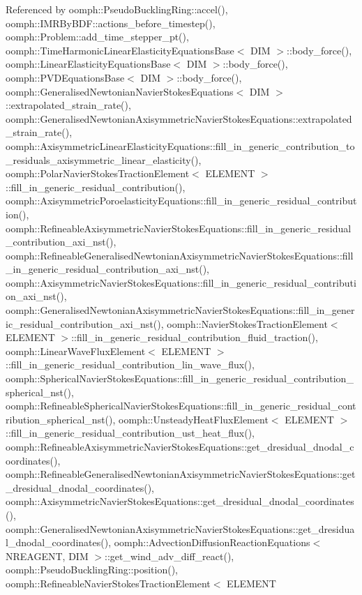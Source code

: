 Referenced by oomph\+::\+Pseudo\+Buckling\+Ring\+::accel(), oomph\+::\+I\+M\+R\+By\+B\+D\+F\+::actions\+\_\+before\+\_\+timestep(), oomph\+::\+Problem\+::add\+\_\+time\+\_\+stepper\+\_\+pt(), oomph\+::\+Time\+Harmonic\+Linear\+Elasticity\+Equations\+Base$<$ D\+I\+M $>$\+::body\+\_\+force(), oomph\+::\+Linear\+Elasticity\+Equations\+Base$<$ D\+I\+M $>$\+::body\+\_\+force(), oomph\+::\+P\+V\+D\+Equations\+Base$<$ D\+I\+M $>$\+::body\+\_\+force(), oomph\+::\+Generalised\+Newtonian\+Navier\+Stokes\+Equations$<$ D\+I\+M $>$\+::extrapolated\+\_\+strain\+\_\+rate(), oomph\+::\+Generalised\+Newtonian\+Axisymmetric\+Navier\+Stokes\+Equations\+::extrapolated\+\_\+strain\+\_\+rate(), oomph\+::\+Axisymmetric\+Linear\+Elasticity\+Equations\+::fill\+\_\+in\+\_\+generic\+\_\+contribution\+\_\+to\+\_\+residuals\+\_\+axisymmetric\+\_\+linear\+\_\+elasticity(), oomph\+::\+Polar\+Navier\+Stokes\+Traction\+Element$<$ E\+L\+E\+M\+E\+N\+T $>$\+::fill\+\_\+in\+\_\+generic\+\_\+residual\+\_\+contribution(), oomph\+::\+Axisymmetric\+Poroelasticity\+Equations\+::fill\+\_\+in\+\_\+generic\+\_\+residual\+\_\+contribution(), oomph\+::\+Refineable\+Axisymmetric\+Navier\+Stokes\+Equations\+::fill\+\_\+in\+\_\+generic\+\_\+residual\+\_\+contribution\+\_\+axi\+\_\+nst(), oomph\+::\+Refineable\+Generalised\+Newtonian\+Axisymmetric\+Navier\+Stokes\+Equations\+::fill\+\_\+in\+\_\+generic\+\_\+residual\+\_\+contribution\+\_\+axi\+\_\+nst(), oomph\+::\+Axisymmetric\+Navier\+Stokes\+Equations\+::fill\+\_\+in\+\_\+generic\+\_\+residual\+\_\+contribution\+\_\+axi\+\_\+nst(), oomph\+::\+Generalised\+Newtonian\+Axisymmetric\+Navier\+Stokes\+Equations\+::fill\+\_\+in\+\_\+generic\+\_\+residual\+\_\+contribution\+\_\+axi\+\_\+nst(), oomph\+::\+Navier\+Stokes\+Traction\+Element$<$ E\+L\+E\+M\+E\+N\+T $>$\+::fill\+\_\+in\+\_\+generic\+\_\+residual\+\_\+contribution\+\_\+fluid\+\_\+traction(), oomph\+::\+Linear\+Wave\+Flux\+Element$<$ E\+L\+E\+M\+E\+N\+T $>$\+::fill\+\_\+in\+\_\+generic\+\_\+residual\+\_\+contribution\+\_\+lin\+\_\+wave\+\_\+flux(), oomph\+::\+Spherical\+Navier\+Stokes\+Equations\+::fill\+\_\+in\+\_\+generic\+\_\+residual\+\_\+contribution\+\_\+spherical\+\_\+nst(), oomph\+::\+Refineable\+Spherical\+Navier\+Stokes\+Equations\+::fill\+\_\+in\+\_\+generic\+\_\+residual\+\_\+contribution\+\_\+spherical\+\_\+nst(), oomph\+::\+Unsteady\+Heat\+Flux\+Element$<$ E\+L\+E\+M\+E\+N\+T $>$\+::fill\+\_\+in\+\_\+generic\+\_\+residual\+\_\+contribution\+\_\+ust\+\_\+heat\+\_\+flux(), oomph\+::\+Refineable\+Axisymmetric\+Navier\+Stokes\+Equations\+::get\+\_\+dresidual\+\_\+dnodal\+\_\+coordinates(), oomph\+::\+Refineable\+Generalised\+Newtonian\+Axisymmetric\+Navier\+Stokes\+Equations\+::get\+\_\+dresidual\+\_\+dnodal\+\_\+coordinates(), oomph\+::\+Axisymmetric\+Navier\+Stokes\+Equations\+::get\+\_\+dresidual\+\_\+dnodal\+\_\+coordinates(), oomph\+::\+Generalised\+Newtonian\+Axisymmetric\+Navier\+Stokes\+Equations\+::get\+\_\+dresidual\+\_\+dnodal\+\_\+coordinates(), oomph\+::\+Advection\+Diffusion\+Reaction\+Equations$<$ N\+R\+E\+A\+G\+E\+N\+T, D\+I\+M $>$\+::get\+\_\+wind\+\_\+adv\+\_\+diff\+\_\+react(), oomph\+::\+Pseudo\+Buckling\+Ring\+::position(), oomph\+::\+Refineable\+Navier\+Stokes\+Traction\+Element$<$ E\+L\+E\+M\+E\+N\+T 
